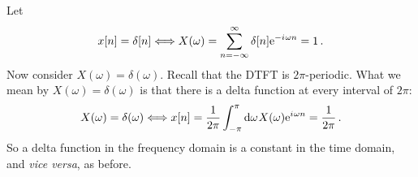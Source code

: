 %
\begin{exmp}
  Let
  \begin{displaymath}
    x[n] = \delta[n] \Longleftrightarrow X(\omega)
    = \sum_{n=-\infty}^\infty\delta[n]\mathrm{e}^{-{i\mkern1mu}\omega n} = 1 \,.
  \end{displaymath}
  Now consider $X(\omega) = \delta(\omega)$. Recall that the DTFT is
  $2\pi$-periodic. What we mean by $X(\omega) = \delta(\omega)$ is that
  there is a delta function at every interval of $2\pi$:
  \begin{displaymath}
    X(\omega) = \delta(\omega) \Longleftrightarrow x[n]
    = \frac{1}{2\pi}\int_{-\pi}^\pi\mathrm{d}\omega\mkern1muX(\omega)\mathrm{e}^{{i\mkern1mu}\omega n} = \frac{1}{2\pi} \,.
  \end{displaymath}
  So a delta function in the frequency domain is a constant in the time
  domain, and \textit{vice versa}, as before.
\end{exmp}
%
